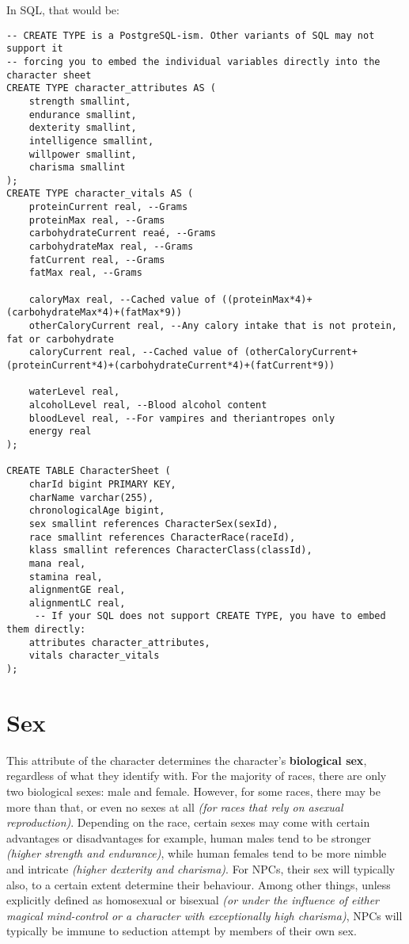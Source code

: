 \documentclass[openany,11pt,a4paper]{book}
\begin{document}
In SQL, that would be:
\begin{lstlisting}[style=SqlStyle]
-- CREATE TYPE is a PostgreSQL-ism. Other variants of SQL may not support it
-- forcing you to embed the individual variables directly into the character sheet
CREATE TYPE character_attributes AS (
	strength smallint,
	endurance smallint,
	dexterity smallint,
	intelligence smallint,
	willpower smallint,
	charisma smallint
);
CREATE TYPE character_vitals AS (
	proteinCurrent real, --Grams
	proteinMax real, --Grams
	carbohydrateCurrent reaé, --Grams
	carbohydrateMax real, --Grams
	fatCurrent real, --Grams
	fatMax real, --Grams
	
	caloryMax real, --Cached value of ((proteinMax*4)+(carbohydrateMax*4)+(fatMax*9))
	otherCaloryCurrent real, --Any calory intake that is not protein, fat or carbohydrate
	caloryCurrent real, --Cached value of (otherCaloryCurrent+(proteinCurrent*4)+(carbohydrateCurrent*4)+(fatCurrent*9))
	
	waterLevel real,
	alcoholLevel real, --Blood alcohol content
	bloodLevel real, --For vampires and theriantropes only
	energy real
);

CREATE TABLE CharacterSheet (
	charId bigint PRIMARY KEY,
	charName varchar(255),
	chronologicalAge bigint,
	sex smallint references CharacterSex(sexId),
	race smallint references CharacterRace(raceId),
	klass smallint references CharacterClass(classId),
	mana real,
	stamina real,
	alignmentGE real,
	alignmentLC real,
	 -- If your SQL does not support CREATE TYPE, you have to embed them directly:
	attributes character_attributes,
	vitals character_vitals
);
\end{lstlisting}
\section{Sex}
This attribute of the character determines the character's \textbf{biological sex}, regardless of what they identify with. For the majority of races, there are only two biological sexes: male and female. However, for some races, there may be more than that, or even no sexes at all \textit{(for races that rely on asexual reproduction)}.\newline
Depending on the race, certain sexes may come with certain advantages or disadvantages \textemdash for example, human males tend to be stronger \textit{(higher strength and endurance)}, while human females tend to be more nimble and intricate \textit{(higher dexterity and charisma)}.
For NPCs, their sex will typically also, to a certain extent determine their behaviour. Among other things, unless explicitly defined as homosexual or bisexual \textit{(or under the influence of either magical mind-control or a character with exceptionally high charisma)}, NPCs will typically be immune to seduction attempt by members of their own sex.
\end{document}
